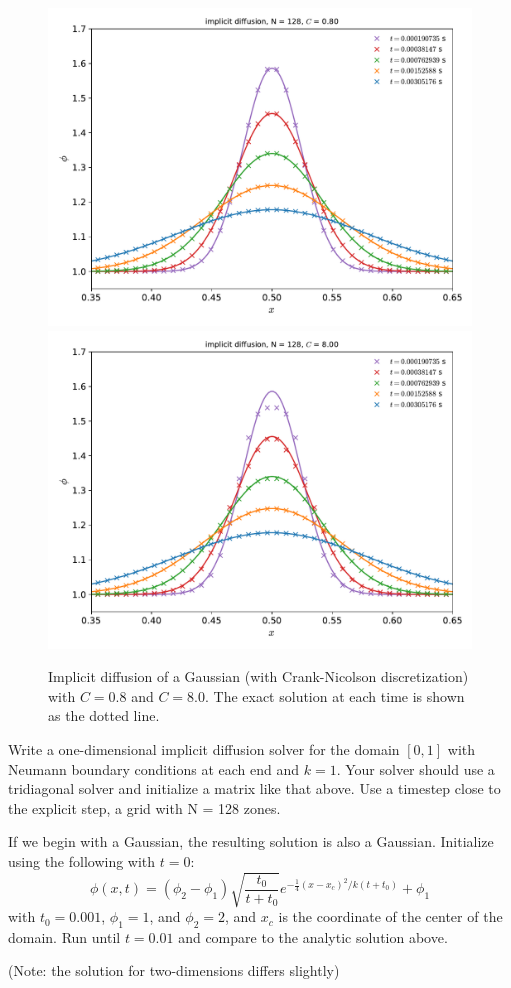 \begin{figure}[t]
\centering
\includegraphics[width=0.7\linewidth]{diff-implicit-128-CFL_0_8}\\
\includegraphics[width=0.7\linewidth]{diff-implicit-128-CFL_8_0}
\caption[Implicit diffusion of a Gaussian]{\label{fig:diffuse} Implicit diffusion of a Gaussian (with Crank-Nicolson discretization)
  with $C = 0.8$ and $C = 8.0$.  The exact solution at each time is shown as the dotted
  line. \\
  }
\end{figure}

\begin{exercise}
{Write a one-dimensional implicit diffusion solver for the
  domain $[0,1]$ with Neumann boundary conditions at each end and $k = 1$.
  Your solver should use a tridiagonal solver and initialize a matrix like
  that above.  Use a timestep close to the explicit step, a grid with
  N = 128 zones.

  If we begin with a Gaussian, the resulting solution is also a Gaussian.
  Initialize using the following with $t = 0$:
  \begin{equation}
   \phi(x,t) = (\phi_2 - \phi_1) \sqrt{\frac{t_0}{t + t_0}} e^{-\frac{1}{4}(x - x_c)^2/k(t+t_0)} + \phi_1
  \end{equation}
  with $t_0 = 0.001$, $\phi_1 = 1$, and $\phi_2 = 2$, and $x_c$ is the
  coordinate of the center of the domain.  Run until $t = 0.01$ and
  compare to the analytic solution above.

  (Note: the solution for two-dimensions differs slightly) }
\end{exercise}



